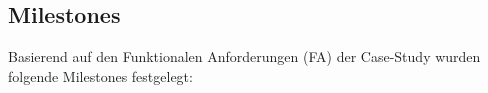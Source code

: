 \subsection{Milestones}
Basierend auf den Funktionalen Anforderungen (FA) der Case-Study wurden folgende Milestones festgelegt:
